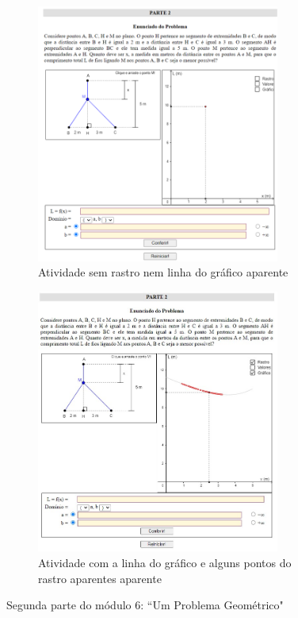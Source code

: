 \begin{figure}
\begin{subfigure}[b]{0.47\textwidth}
    \centering
    \includegraphics[width=8cm]{media/CDME-prob-geometrico-21.png}
    \caption{Atividade sem rastro nem linha do gráfico aparente}
\end{subfigure}
% 
\hfill
% 
\begin{subfigure}[b]{0.47\textwidth}
    \includegraphics[width=8cm]{media/CDME-problema-geometric-grafico-rastro.jpg}
    \caption{Atividade com a linha do gráfico e alguns pontos do rastro aparentes aparente}
\end{subfigure}
    \caption{Segunda parte do módulo 6: ``Um Problema Geométrico"}
    \label{fig:otimo13-2}
\end{figure}

